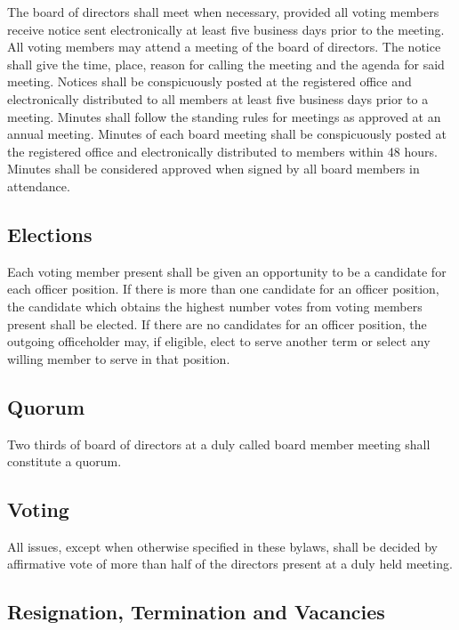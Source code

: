 \documentclass[10pt,letterpaper,titlepage]{article}
\begin{document}
The board of directors shall meet when necessary, provided all voting members
receive notice sent electronically at least five business days prior to the
meeting.
All voting members may attend a meeting of the board of directors.
The notice shall give the time, place, reason for calling the meeting and the
agenda for said meeting.
Notices shall be conspicuously posted at the registered office and
electronically distributed to all members at least five business days prior to
a meeting.
Minutes shall follow the standing rules for meetings as approved at an annual
meeting.
Minutes of each board meeting shall be conspicuously posted at the registered
office and electronically distributed to members within 48 hours.
Minutes shall be considered approved when signed by all board members in
attendance.

\subsection{Elections}
\label{elections}

Each voting member present shall be given an opportunity to be a candidate for each
officer position.
If there is more than one candidate for an officer position, the candidate
which obtains the highest number votes from voting members present shall be
elected.
If there are no candidates for an officer position, the outgoing officeholder
may, if eligible, elect to serve another term or select any willing member to
serve in that position.

\subsection{Quorum}

Two thirds of board of directors at a duly called board member meeting shall
constitute a quorum.

\subsection{Voting}

All issues, except when otherwise specified in these bylaws, shall be decided
by affirmative vote of more than half of the directors present at a duly held
meeting.

\subsection{Resignation, Termination and Vacancies}
\end{document}
